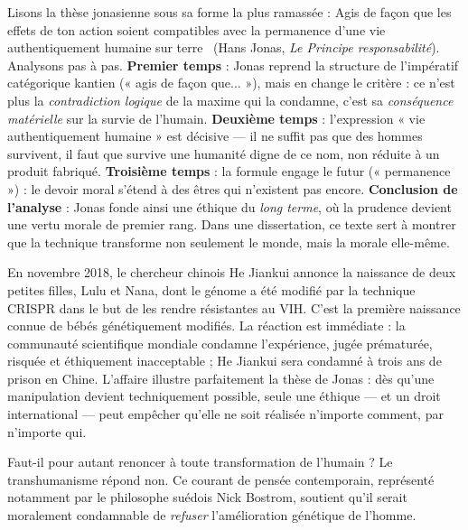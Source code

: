 \documentclass[11pt]{article}
\newcommand{\cle}[1]{{\popxbold\color{popdark}#1}}
\newcounter{popsec}
\newcounter{popsub}
\newcommand{\courssub}[1]{%
  \stepcounter{popsub}%
  \par\vspace{9pt}\noindent{\popxbold\fontsize{11.5}{13}\selectfont\color{popink}{\color{poporange}\thepopsec.\thepopsub}\hspace{6pt}#1}\par\nopagebreak\vspace{4pt}
}
\begin{document}
\begin{experience}
Lisons la thèse jonasienne sous sa forme la plus ramassée : \guillemotleft Agis de façon que les effets de ton action soient compatibles avec la permanence d'une vie authentiquement humaine sur terre \guillemotright\ (Hans Jonas, \emph{Le Principe responsabilité}). Analysons pas à pas. \textbf{Premier temps} : Jonas reprend la structure de l'impératif catégorique kantien (« agis de façon que... »), mais en change le critère : ce n'est plus la \emph{contradiction logique} de la maxime qui la condamne, c'est sa \emph{conséquence matérielle} sur la survie de l'humain. \textbf{Deuxième temps} : l'expression « vie authentiquement humaine » est décisive — il ne suffit pas que des hommes survivent, il faut que survive une humanité digne de ce nom, non réduite à un produit fabriqué. \textbf{Troisième temps} : la formule engage le futur (« permanence ») : le devoir moral s'étend à des êtres qui n'existent pas encore. \textbf{Conclusion de l'analyse} : Jonas fonde ainsi une éthique du \emph{long terme}, où la prudence devient une vertu morale de premier rang. Dans une dissertation, ce texte sert à montrer que la technique transforme non seulement le monde, mais la morale elle-même.
\end{experience}

\begin{savaistu}
En novembre 2018, le chercheur chinois He Jiankui annonce la naissance de deux petites filles, Lulu et Nana, dont le génome a été modifié par la technique CRISPR dans le but de les rendre résistantes au VIH. C'est la première naissance connue de bébés génétiquement modifiés. La réaction est immédiate : la communauté scientifique mondiale condamne l'expérience, jugée prématurée, risquée et éthiquement inacceptable ; He Jiankui sera condamné à trois ans de prison en Chine. L'affaire illustre parfaitement la thèse de Jonas : dès qu'une manipulation devient techniquement possible, seule une éthique — et un droit international — peut empêcher qu'elle ne soit réalisée n'importe comment, par n'importe qui.
\end{savaistu}

\courssub{La thèse adverse : le transhumanisme}

Faut-il pour autant renoncer à toute transformation de l'humain ? Le \cle{transhumanisme} répond non. Ce courant de pensée contemporain, représenté notamment par le philosophe suédois Nick Bostrom, soutient qu'il serait moralement condamnable de \emph{refuser} l'amélioration génétique de l'homme.
\end{document}

